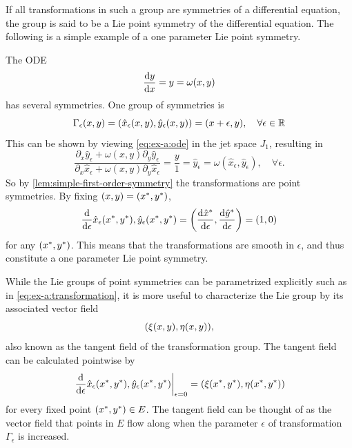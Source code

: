 If all transformations in such a group are symmetries of a differential equation, the group is said to be a Lie point symmetry of the differential equation.
The following is a simple example of a one parameter Lie point symmetry.
\begin{exmp}
  The ODE
  \begin{equation} \label{eq:ex-a:ode}
    \diff{y}{x} = y = \omega(x, y)
  \end{equation}
  has several symmetries.
  One group of symmetries is
  \begin{equation} \label{eq:ex-a:transformation}
    \Gamma_\epsilon(x,y) =
    \pqty{\hat{x}_\epsilon(x,y), \hat{y}_\epsilon(x,y)} =
    \pqty{x + \epsilon, y}, \quad
    \forall \epsilon \in \reals
  \end{equation}
  This can be shown by viewing \cref{eq:ex-a:ode} in the jet space \(J_1\), resulting in
  \begin{equation}
    \frac{\partial_x \hat{y}_\epsilon + \omega(x,y) \partial_y \hat{y}_\epsilon}{\partial_x \hat{x}_\epsilon + \omega(x,y) \partial_y \hat{x}_\epsilon} =
    \frac{y}{1} =
    \hat{y}_\epsilon =
    \omega(\hat{x}_\epsilon,\hat{y}_\epsilon), \quad
    \forall \epsilon.
  \end{equation}
  So by \cref{lem:simple-first-order-symmetry} the transformations are point symmetries.
  By fixing \(\pqty{x,y}=\pqty{\fixed{x},\fixed{y}}\),
  \begin{equation}
    \diff*{\hat{x}_\epsilon(\fixed{x},\fixed{y}), \hat{y}_\epsilon(\fixed{x},\fixed{y})}{\epsilon} =
    \pqty{\diff{\fixed{\hat{x}}}{\epsilon}, \diff{\fixed{\hat{y}}}{\epsilon}} =
    \pqty{1,0}
  \end{equation}
  for any \(\pqty{\fixed{x},\fixed{y}}\).
  This means that the transformations are smooth in \(\epsilon\), and thus constitute a one parameter Lie point symmetry.
\end{exmp}
While the Lie groups of point symmetries can be parametrized explicitly such as in \cref{eq:ex-a:transformation}, it is more useful to characterize the Lie group by its associated vector field
\begin{equation} \label{eq:tangent-field}
  \pqty{\xi(x,y), \eta(x,y)},
\end{equation}
also known as the tangent field of the transformation group.
The tangent field can be calculated pointwise by 
\begin{equation}
  \eval{\diff*{\hat{x}_\epsilon(\fixed{x},\fixed{y}), \hat{y}_\epsilon(\fixed{x},\fixed{y})}{\epsilon}}_{\epsilon=0} = \pqty{\xi(\fixed{x},\fixed{y}), \eta(\fixed{x},\fixed{y})}
\end{equation}
for every fixed point \(\pqty{\fixed{x},\fixed{y}} \in E\).
The tangent field can be thought of as the vector field that points in \(E\) flow along when the parameter \(\epsilon\) of transformation \(\Gamma_\epsilon\) is increased.


